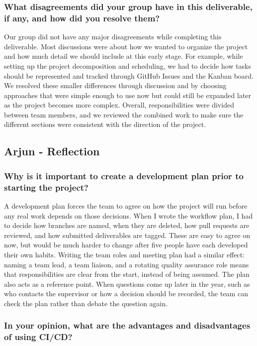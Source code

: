 \documentclass{article}
\begin{document}
\subsubsection*{What disagreements did your group have in this deliverable, if any,
    and how did you resolve them?}
Our group did not have any major disagreements while completing this deliverable. Most discussions were about how we wanted to 
organize the project and how much detail we should include at this early stage. For example, while setting up the project decomposition 
and scheduling, we had to decide how tasks should be represented and tracked through GitHub Issues and the Kanban board. We resolved these 
smaller differences through discussion and by choosing approaches that were simple enough to use now but could still be expanded later as 
the project becomes more complex. Overall, responsibilities were divided between team members, and we reviewed the combined work to make 
sure the different sections were consistent with the direction of the project.

\subsection*{Arjun - Reflection}
\subsubsection*{Why is it important to create a development plan prior to starting the
    project?}

A development plan forces the team to agree on how the project will run
before any real work depends on those decisions. When I wrote the workflow
plan, I had to decide how branches are named, when they are deleted, how pull
requests are reviewed, and how submitted deliverables are tagged. These are
easy to agree on now, but would be much harder to change after five people
have each developed their own habits. Writing the team roles and meeting plan
had a similar effect: naming a team lead, a team liaison, and a rotating
quality assurance role means that responsibilities are clear from the start,
instead of being assumed. The plan also acts as a reference point. When
questions come up later in the year, such as who contacts the supervisor or
how a decision should be recorded, the team can check the plan rather than
debate the question again.

\subsubsection*{In your opinion, what are the advantages and disadvantages of using
    CI/CD?}
\end{document}
